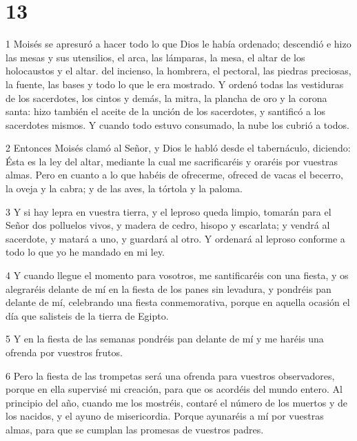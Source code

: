 \chapter{13}

\par 1 Moisés se apresuró a hacer todo lo que Dios le había ordenado; descendió e hizo las mesas y sus utensilios, el arca, las lámparas, la mesa, el altar de los holocaustos y el altar. del incienso, la hombrera, el pectoral, las piedras preciosas, la fuente, las bases y todo lo que le era mostrado. Y ordenó todas las vestiduras de los sacerdotes, los cintos y demás, la mitra, la plancha de oro y la corona santa: hizo también el aceite de la unción de los sacerdotes, y santificó a los sacerdotes mismos. Y cuando todo estuvo consumado, la nube los cubrió a todos.

\par 2 Entonces Moisés clamó al Señor, y Dios le habló desde el tabernáculo, diciendo: Ésta es la ley del altar, mediante la cual me sacrificaréis y oraréis por vuestras almas. Pero en cuanto a lo que habéis de ofrecerme, ofreced de vacas el becerro, la oveja y la cabra; y de las aves, la tórtola y la paloma.

\par 3 Y si hay lepra en vuestra tierra, y el leproso queda limpio, tomarán para el Señor dos polluelos vivos, y madera de cedro, hisopo y escarlata; y vendrá al sacerdote, y matará a uno, y guardará al otro. Y ordenará al leproso conforme a todo lo que yo he mandado en mi ley.

\par 4 Y cuando llegue el momento para vosotros, me santificaréis con una fiesta, y os alegraréis delante de mí en la fiesta de los panes sin levadura, y pondréis pan delante de mí, celebrando una fiesta conmemorativa, porque en aquella ocasión el día que salisteis de la tierra de Egipto.

\par 5 Y en la fiesta de las semanas pondréis pan delante de mí y me haréis una ofrenda por vuestros frutos.

\par 6 Pero la fiesta de las trompetas será una ofrenda para vuestros observadores, porque en ella supervisé mi creación, para que os acordéis del mundo entero. Al principio del año, cuando me los mostréis, contaré el número de los muertos y de los nacidos, y el ayuno de misericordia. Porque ayunaréis a mí por vuestras almas, para que se cumplan las promesas de vuestros padres.

